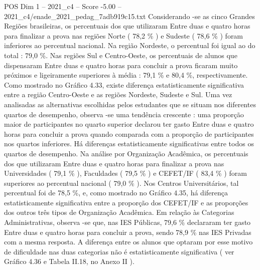\begin{textsample}{POS Dim 1 – 2021\_c4 – Score -5.00 – 2021\_c4/enade\_2021\_pedag\_7adb919c15.txt}
Considerando -se as cinco Grandes Regiões brasileiras, os percentuais dos que utilizaram Entre duas e quatro horas para finalizar a prova nas regiões Norte ( 78,2 \% ) e Sudeste ( 78,6 \% ) foram inferiores ao percentual nacional.
Na região Nordeste, o percentual foi igual ao do total : 79,0 \%.
Nas regiões Sul e Centro-Oeste, os percentuais de alunos que dispensaram Entre duas e quatro horas para concluir a prova ficaram muito próximos e ligeiramente superiores à média : 79,1 \% e 80,4 \%, respectivamente.
Como mostrado no Gráfico 4.33, existe diferença estatisticamente significativa entre a região Centro-Oeste e as regiões Nordeste, Sudeste e Sul.
Uma vez analisadas as alternativas escolhidas pelos estudantes que se situam nos diferentes quartos de desempenho, observa -se uma tendência crescente : uma proporção maior de participantes no quarto superior declarou ter gasto Entre duas e quatro horas para concluir a prova quando comparada com a proporção de participantes nos quartos inferiores.
Há diferenças estatisticamente significativas entre todos os quartos de desempenho.
Na análise por Organização Acadêmica, os percentuais dos que utilizaram Entre duas e quatro horas para finalizar a prova nas Universidades ( 79,1 \% ), Faculdades ( 79,5 \% ) e CEFET/IF ( 83,4 \% ) foram superiores ao percentual nacional ( 79,0 \% ).
Nos Centros Universitários, tal percentual foi de 78,5 \%, e, como mostrado no Gráfico 4.35, há diferença estatisticamente significativa entre a proporção dos CEFET/IF e as proporções dos outros três tipos de Organização Acadêmica.
Em relação às Categorias Administrativas, observa -se que, nas IES Públicas, 79,6 \% declararam ter gasto Entre duas e quatro horas para concluir a prova, sendo 78,9 \% nas IES Privadas com a mesma resposta.
A diferença entre os alunos que optaram por esse motivo de dificuldade nas duas categorias não é estatisticamente significativa ( ver Gráfico 4.36 e Tabela II.18, no Anexo II ).

\end{textsample}
